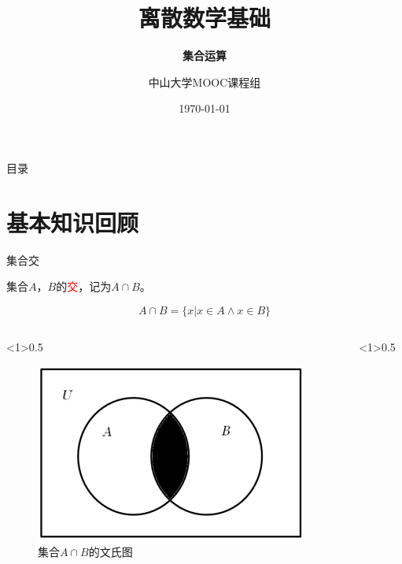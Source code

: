 \documentclass[xetex,10pt,aspectratio=43]{beamer}
\title{离散数学基础}
\subtitle{\fontsize{9pt}{14pt}\textbf{集合运算}}
\author{中山大学MOOC课程组}
\institute{\fontsize{8pt}{14pt}中山大学计算机学院}
\date{\today}
\begin{document}
	
	\frame{\titlepage}
	
	\section[目录]{}   %
	\begin{frame}{目录}
		\tableofcontents
	\end{frame}

	\section{基本知识回顾}
	
	\begin{frame}{集合交}
		
		集合$A$，$B$的\textcolor{red}{交}，记为$A\cap B$。
		
		$$A\cap B=\{x|x\in A\wedge x\in B\}$$
		
		\begin{columns}
			
			\begin{column}<1>{0.5\textwidth}
				
				\begin{figure}
					
					\centering
					
					\includegraphics[scale=0.5]{9.png}
					
					\caption{集合$A\cap B$的文氏图}
					
				\end{figure}
			
			\end{column}
		
			\begin{column}<1>{0.5\textwidth}
				
				\begin{table}
				

\end{table}
\end{column}
\end{columns}
\end{frame}
\end{document}
